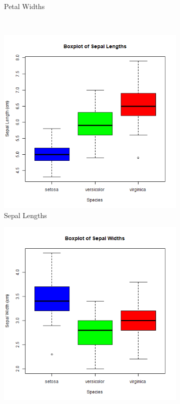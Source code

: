 \documentclass{article}
\begin{document}
\begin{figure}[H]
\begin{subfigure}{0.375\textwidth}
      \caption{Petal Widths}
      \label{fig:feature_boxplots_B}
    \end{subfigure}\\
    \begin{subfigure}{0.375\textwidth}
        \centering
        \includegraphics[width=\linewidth]{box_sepal_length.png}
        \caption{Sepal Lengths}
        \label{fig:feature_boxplots_C}
    \end{subfigure}
    \begin{subfigure}{0.375\textwidth}
        \centering
        \includegraphics[width=\linewidth]{box_sepal_width.png}

\end{subfigure}
\end{figure}
\end{document}
